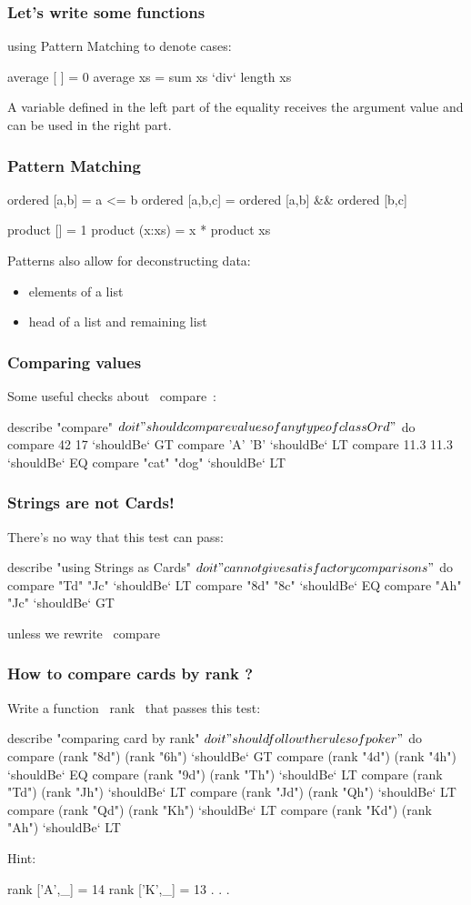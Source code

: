 \documentclass[11pt,xcolor={dvipsnames}]{beamer}
\newcommand{\vs}{\vspace{1em}}
\begin{document}
\begin{frame}[fragile]
\frametitle{Let's write some functions}
using Pattern Matching to denote cases: 
\vs
\begin{haskell}
average [ ]  = 0
average xs   = sum xs `div` length xs
\end{haskell}
\vs
A variable defined in the left part of the equality receives the argument value and can be used in the right part.
\end{frame}
\begin{frame}[fragile]
\frametitle{Pattern Matching}
\begin{haskell}
ordered [a,b]   = a <= b
ordered [a,b,c] = ordered [a,b] && ordered [b,c]

product []     = 1
product (x:xs) = x * product xs
\end{haskell}
\vs
Patterns also allow for deconstructing data:
\begin{itemize}
\item elements of a list
\item head of a list and remaining list 
\end{itemize}
\end{frame}
\begin{frame}[fragile]
\frametitle{Comparing values}
Some useful checks about ~compare~:
\vs
\begin{hspec}
describe "compare" $ do
    it "should compare values of any type of class Ord" $ do
        compare 42 17       `shouldBe` GT
        compare 'A' 'B'     `shouldBe` LT
        compare 11.3 11.3   `shouldBe` EQ
        compare "cat" "dog" `shouldBe` LT
\end{hspec}
\end{frame}
\begin{frame}[fragile]
\frametitle{Strings are not Cards!}
There's no way that this test can pass:
\vs
\begin{hspec}
describe "using Strings as Cards" $ do
    it "cannot give satisfactory comparisons" $ do
        compare "Td" "Jc"  `shouldBe` LT
        compare "8d" "8c"  `shouldBe` EQ
        compare "Ah" "Jc"  `shouldBe` GT
\end{hspec}
\vs
unless we rewrite ~compare~ 
\end{frame}
\begin{frame}[fragile]
\frametitle{How to compare cards by rank ?}
Write a function ~rank~ that passes this test:
\vs
\begin{hspec}
describe "comparing card by rank" $ do
    it "should follow the rules of poker" $ do
        compare (rank "8d") (rank "6h") `shouldBe` GT
        compare (rank "4d") (rank "4h") `shouldBe` EQ
        compare (rank "9d") (rank "Th") `shouldBe` LT 
        compare (rank "Td") (rank "Jh") `shouldBe` LT 
        compare (rank "Jd") (rank "Qh") `shouldBe` LT 
        compare (rank "Qd") (rank "Kh") `shouldBe` LT 
        compare (rank "Kd") (rank "Ah") `shouldBe` LT 
\end{hspec}
Hint:
\begin{haskell}
rank ['A',_] = 14
rank ['K',_] = 13
    . . .
\end{haskell}
\end{frame}
\end{document}
